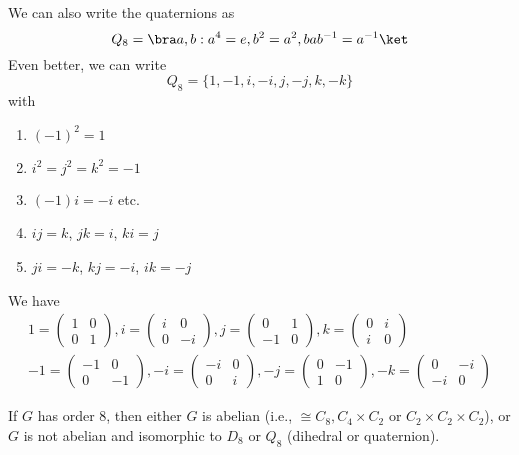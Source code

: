 \documentclass[a4pape]{article}
\begin{document}
\begin{notation}
  We can also write the quaternions as
  \[
  Q_8 = \bra a, b : a^4 = e, b^2 = a^2, bab^{-1} = a^{-1}\ket
  \]
  Even better, we can write
  \[
  Q_8 = \{1, -1, i, -i, j, -j, k, -k\}
  \]
  with
  \begin{enumerate}
  \item $(-1)^2 = 1$
  \item $i^2 = j^2 = k^2 = -1$
  \item $(-1)i = -i$ etc.
  \item $ij = k$, $jk = i$, $ki = j$
  \item $ji = -k$, $kj = -i$, $ik = -j$
  \end{enumerate}
  We have
  \begin{gather*}
    1 = \begin{pmatrix}
      1&0\\0&1
    \end{pmatrix}, 
    i = \begin{pmatrix}
      i & 0\\0&-i
    \end{pmatrix},
    j = \begin{pmatrix}
      0&1\\-1&0
    \end{pmatrix},
    k = \begin{pmatrix}
      0&i\\i&0
    \end{pmatrix}\\
    -1 = \begin{pmatrix}
      -1&0\\0&-1
    \end{pmatrix}, 
    -i = \begin{pmatrix}
      -i & 0\\0&i
    \end{pmatrix},
    -j = \begin{pmatrix}
      0&-1\\1&0
    \end{pmatrix},
    -k = \begin{pmatrix}
      0&-i\\-i&0
    \end{pmatrix}
  \end{gather*}
\end{notation}

\begin{lemma}
  If $G$ has order 8, then either $G$ is abelian (i.e., $\cong C_8, C_4\times C_2$ or $C_2\times C_2\times C_2$), or $G$ is not abelian and isomorphic to $D_8$ or $Q_8$ (dihedral or quaternion).
\end{lemma}
\end{document}
